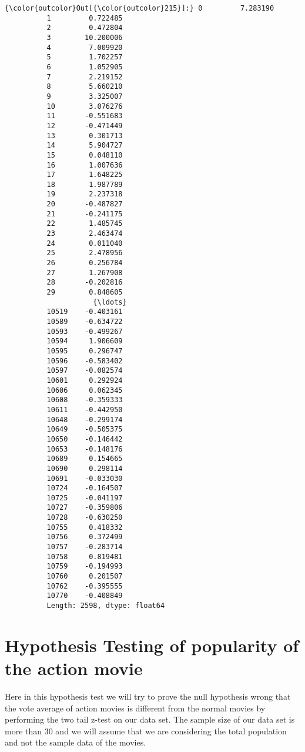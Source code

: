 \documentclass[11pt]{article}
\begin{document}
\begin{Verbatim}[commandchars=\\\{\}]
{\color{outcolor}Out[{\color{outcolor}215}]:} 0         7.283190
          1         0.722485
          2         0.472804
          3        10.200006
          4         7.009920
          5         1.702257
          6         1.052905
          7         2.219152
          8         5.660210
          9         3.325007
          10        3.076276
          11       -0.551683
          12       -0.471449
          13        0.301713
          14        5.904727
          15        0.048110
          16        1.007636
          17        1.648225
          18        1.987789
          19        2.237318
          20       -0.487827
          21       -0.241175
          22        1.485745
          23        2.463474
          24        0.011040
          25        2.478956
          26        0.256784
          27        1.267908
          28       -0.202816
          29        0.848605
                     {\ldots}    
          10519    -0.403161
          10589    -0.634722
          10593    -0.499267
          10594     1.906609
          10595     0.296747
          10596    -0.583402
          10597    -0.082574
          10601     0.292924
          10606     0.062345
          10608    -0.359333
          10611    -0.442950
          10648    -0.299174
          10649    -0.505375
          10650    -0.146442
          10653    -0.148176
          10689     0.154665
          10690     0.298114
          10691    -0.033030
          10724    -0.164507
          10725    -0.041197
          10727    -0.359806
          10728    -0.630250
          10755     0.418332
          10756     0.372499
          10757    -0.283714
          10758     0.819481
          10759    -0.194993
          10760     0.201507
          10762    -0.395555
          10770    -0.408849
          Length: 2598, dtype: float64
\end{Verbatim}
            
    \section{Hypothesis Testing of popularity of the action
movie}\label{hypothesis-testing-of-popularity-of-the-action-movie}

Here in this hypothesis test we will try to prove the null hypothesis
wrong that the vote average of action movies is different from the
normal movies by performing the two tail z-test on our data set. The
sample size of our data set is more than 30 and we will assume that we
are considering the total population and not the sample data of the
movies.
\end{document}
